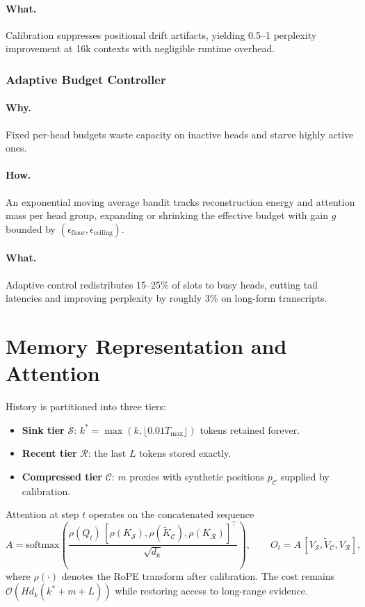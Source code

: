 \documentclass[11pt]{article}
\newcommand{\sink}{\mathcal{S}}
\newcommand{\recent}{\mathcal{R}}
\newcommand{\compressed}{\mathcal{C}}
\begin{document}
\paragraph{What.}
Calibration suppresses positional drift artifacts, yielding 0.5--1 perplexity improvement at 16k contexts with negligible runtime overhead.

\subsubsection{Adaptive Budget Controller}
\paragraph{Why.}
Fixed per-head budgets waste capacity on inactive heads and starve highly active ones.
\paragraph{How.}
An exponential moving average bandit tracks reconstruction energy and attention mass per head group, expanding or shrinking the effective budget with gain $g$ bounded by $(\epsilon_{\text{floor}}, \epsilon_{\text{ceiling}})$.
\paragraph{What.}
Adaptive control redistributes 15--25\% of slots to busy heads, cutting tail latencies and improving perplexity by roughly 3\% on long-form transcripts.

\section{Memory Representation and Attention}
History is partitioned into three tiers:
\begin{itemize}
  \item \textbf{Sink tier} $\sink$: $k^* = \max(k, \lfloor 0.01 T_{\max} \rfloor)$ tokens retained forever.
  \item \textbf{Recent tier} $\recent$: the last $L$ tokens stored exactly.
  \item \textbf{Compressed tier} $\compressed$: $m$ proxies with synthetic positions $p_{\compressed}$ supplied by calibration.
\end{itemize}
Attention at step $t$ operates on the concatenated sequence
\[
  A = \mathrm{softmax}\!\left( \frac{ \rho(Q_t)\,[\rho(K_{\sink}),\rho(\tilde K_{\compressed}),\rho(K_{\recent})]^\top }{\sqrt{d_k}} \right),
  \qquad
  O_t = A\,[V_{\sink},\tilde V_{\compressed},V_{\recent}],
\]
where $\rho(\cdot)$ denotes the RoPE transform after calibration.
The cost remains $\mathcal{O}(H d_k (k^* + m + L))$ while restoring access to long-range evidence.
\end{document}
